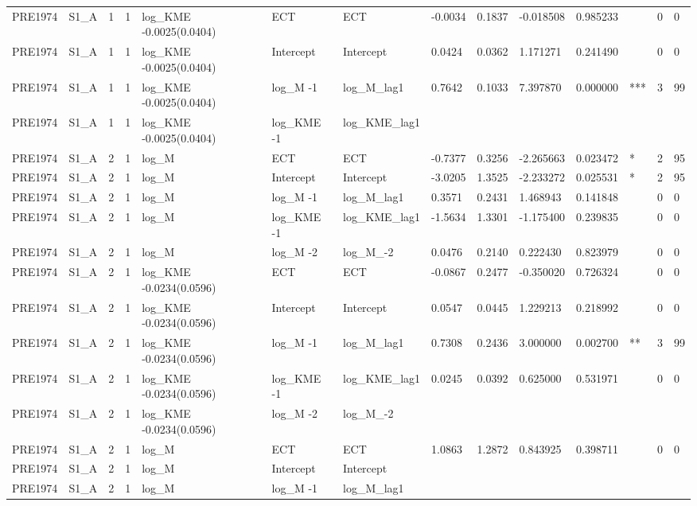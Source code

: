 \begin{tabular}{llllllllllllll}
PRE1974 & S1\_A & 1 & 1 & log\_KME -0.0025(0.0404) & ECT & ECT & -0.0034 & 0.1837 & -0.018508 & 0.985233 &  & 0 & 0 \\
PRE1974 & S1\_A & 1 & 1 & log\_KME -0.0025(0.0404) & Intercept & Intercept & 0.0424 & 0.0362 & 1.171271 & 0.241490 &  & 0 & 0 \\
PRE1974 & S1\_A & 1 & 1 & log\_KME -0.0025(0.0404) & log\_M -1 & log\_M\_lag1 & 0.7642 & 0.1033 & 7.397870 & 0.000000 & *** & 3 & 99 \\
PRE1974 & S1\_A & 1 & 1 & log\_KME -0.0025(0.0404) & log\_KME -1 & log\_KME\_lag1 &  &  &  &  &  &  &  \\
PRE1974 & S1\_A & 2 & 1 & log\_M & ECT & ECT & -0.7377 & 0.3256 & -2.265663 & 0.023472 & * & 2 & 95 \\
PRE1974 & S1\_A & 2 & 1 & log\_M & Intercept & Intercept & -3.0205 & 1.3525 & -2.233272 & 0.025531 & * & 2 & 95 \\
PRE1974 & S1\_A & 2 & 1 & log\_M & log\_M -1 & log\_M\_lag1 & 0.3571 & 0.2431 & 1.468943 & 0.141848 &  & 0 & 0 \\
PRE1974 & S1\_A & 2 & 1 & log\_M & log\_KME -1 & log\_KME\_lag1 & -1.5634 & 1.3301 & -1.175400 & 0.239835 &  & 0 & 0 \\
PRE1974 & S1\_A & 2 & 1 & log\_M & log\_M -2 & log\_M\_-2 & 0.0476 & 0.2140 & 0.222430 & 0.823979 &  & 0 & 0 \\
PRE1974 & S1\_A & 2 & 1 & log\_KME -0.0234(0.0596) & ECT & ECT & -0.0867 & 0.2477 & -0.350020 & 0.726324 &  & 0 & 0 \\
PRE1974 & S1\_A & 2 & 1 & log\_KME -0.0234(0.0596) & Intercept & Intercept & 0.0547 & 0.0445 & 1.229213 & 0.218992 &  & 0 & 0 \\
PRE1974 & S1\_A & 2 & 1 & log\_KME -0.0234(0.0596) & log\_M -1 & log\_M\_lag1 & 0.7308 & 0.2436 & 3.000000 & 0.002700 & ** & 3 & 99 \\
PRE1974 & S1\_A & 2 & 1 & log\_KME -0.0234(0.0596) & log\_KME -1 & log\_KME\_lag1 & 0.0245 & 0.0392 & 0.625000 & 0.531971 &  & 0 & 0 \\
PRE1974 & S1\_A & 2 & 1 & log\_KME -0.0234(0.0596) & log\_M -2 & log\_M\_-2 &  &  &  &  &  &  &  \\
PRE1974 & S1\_A & 2 & 1 & log\_M & ECT & ECT & 1.0863 & 1.2872 & 0.843925 & 0.398711 &  & 0 & 0 \\
PRE1974 & S1\_A & 2 & 1 & log\_M & Intercept & Intercept &  &  &  &  &  &  &  \\
PRE1974 & S1\_A & 2 & 1 & log\_M & log\_M -1 & log\_M\_lag1 &  &  &  &  &  &  &  \\

\end{tabular}
